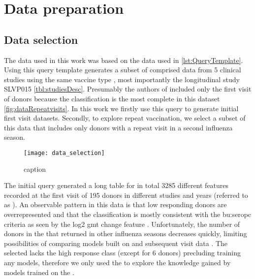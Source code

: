 \section{Data preparation}

\subsection{Data selection}

The data used in this work was based on the data used in \spaper \autoref{lst:QueryTemplate}.
Using this query template generates a subset of \flup comprised data from 5 clinical studies using the same vaccine type , most importantly the longitudinal study SLVP015 \autoref{tbl:studiesDesc}.
Presumably the authors of \spaper included only the first visit of donors because the classification is the most complete in this dataset \autoref{fig:dataRepeatvisits}.
In this work we firstly use this query to generate initial first visit datasets.
Secondly, to explore repeat vaccination, we select a subset of this data that includes only donors with a repeat visit in a second influenza season.

\begin{figure}[htpb]
    \texttt{[image: data\_selection]}
    \caption{caption}\label{fig:dataRepeatvisits}
\end{figure}

The initial query generated a long table for in total 3285 different features recorded at the first visit of 195 donors in different studies and years (referred to as \firstvis).
An observable pattern in this data is that low responding donors are overrepresented and that the classification is mostly consistent with the \gls{bu:seropc} criteria as seen by the log2 \acrshort{gmt} change feature .
Unfortunately, the number of donors in the \firstvis that returned in other influenza seasons decreases quickly, limiting possibilities of comparing models built on \firstvis and subsequent visit data .
The selected \secondvis lacks the high response class (except for 6 donors) precluding training any models, therefore we only used the \secondvis to explore the knowledge gained by models trained on the \firstvis {}.

